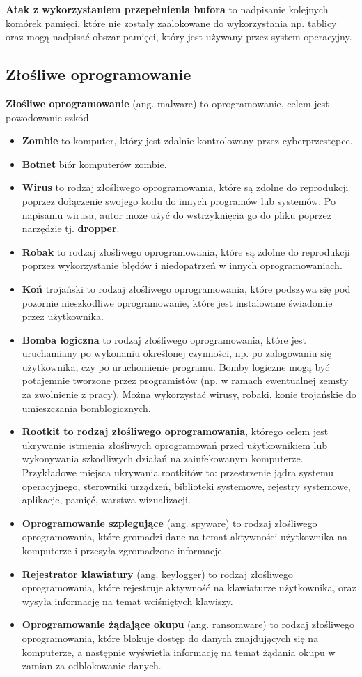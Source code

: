 \documentclass{article}
\begin{document}
\textbf{Atak z wykorzystaniem przepełnienia bufora} to nadpisanie kolejnych komórek pamięci, które nie zostały zaalokowane do wykorzystania np. tablicy oraz mogą nadpisać obszar pamięci, który jest używany przez system operacyjny.
\subsection{Złośliwe oprogramowanie}
\textbf{Złośliwe oprogramowanie} (ang. malware) to oprogramowanie, celem jest powodowanie szkód.
\begin{itemize}
    \item \textbf{Zombie} to komputer, który jest zdalnie kontrolowany przez cyberprzestępce.
    \item \textbf{Botnet} biór komputerów zombie.
    \item \textbf{Wirus} to rodzaj złośliwego oprogramowania, które są zdolne do reprodukcji poprzez dołączenie swojego kodu do innych programów lub systemów. Po napisaniu wirusa, autor może użyć do wstrzyknięcia go do pliku poprzez narzędzie tj. \textbf{dropper}.
    \item \textbf{Robak} to rodzaj złośliwego oprogramowania, które są zdolne do reprodukcji poprzez wykorzystanie błędów i niedopatrzeń w innych oprogramowaniach.
    \item \textbf{Koń} trojański to rodzaj złośliwego oprogramowania, które podszywa się pod pozornie nieszkodliwe oprogramowanie, które jest instalowane świadomie przez użytkownika.
    \item \textbf{Bomba logiczna} to rodzaj złośliwego oprogramowania, które jest uruchamiany po wykonaniu określonej czynności, np. po zalogowaniu się użytkownika, czy po uruchomienie programu. Bomby logiczne mogą być potajemnie tworzone przez programistów (np. w ramach ewentualnej zemsty za zwolnienie z pracy). Można wykorzystać wirusy, robaki, konie trojańskie do umieszczania bomblogicznych.
    \item \textbf{Rootkit to rodzaj złośliwego oprogramowania}, którego celem jest ukrywanie istnienia złośliwych oprogramowań przed użytkownikiem lub wykonywania szkodliwych działań na zainfekowanym komputerze. Przykładowe miejsca ukrywania rootkitów to: przestrzenie jądra systemu operacyjnego, sterowniki urządzeń, biblioteki systemowe, rejestry systemowe, aplikacje, pamięć, warstwa wizualizacji.
    \item \textbf{Oprogramowanie szpiegujące} (ang. spyware) to rodzaj złośliwego oprogramowania, które gromadzi dane na temat aktywności użytkownika na komputerze i przesyła zgromadzone informacje.
    \item \textbf{Rejestrator klawiatury} (ang. keylogger) to rodzaj złośliwego oprogramowania, które rejestruje aktywność na klawiaturze użytkownika, oraz wysyła informację na temat wciśniętych klawiszy.
    \item \textbf{Oprogramowanie żądające okupu} (ang. ransomware) to rodzaj złośliwego oprogramowania, które blokuje dostęp do danych znajdujących się na komputerze, a następnie wyświetla informację na temat żądania okupu w zamian za odblokowanie danych.
\end{itemize}
\end{document}
